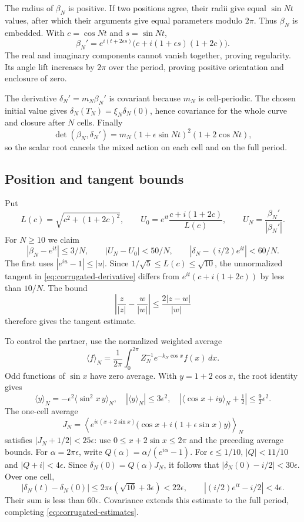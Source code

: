 \documentclass[11pt]{amsart}
\theoremstyle{definition}
\theoremstyle{remark}
\numberwithin{equation}{section}
\begin{document}
The radius of $\beta_N$ is positive. If two positions agree, their radii
give equal $\sin Nt$ values, after which their arguments give equal
parameters modulo $2\pi$. Thus $\beta_N$ is embedded. With
$c=\cos Nt$ and $s=\sin Nt$,
\begin{equation}\label{eq:corrugated-derivative}
 \beta_N'=e^{i(t+2\epsilon s)}
       \bigl(c+i(1+\epsilon s)(1+2c)\bigr).
\end{equation}
The real and imaginary components cannot vanish together, proving
regularity. Its angle lift increases by $2\pi$ over the period, proving
positive orientation and enclosure of zero.

The derivative $\delta_N'=m_N\beta_N'$ is covariant because $m_N$ is
cell-periodic. The chosen initial value gives
$\delta_N(T_N)=\xi_N\delta_N(0)$, hence covariance for the whole curve
and closure after $N$ cells. Finally
\[
 \det(\beta_N,\delta_N')
 =m_N(1+\epsilon\sin Nt)^2(1+2\cos Nt),
\]
so the scalar root cancels the mixed action on each cell and on the full
period.

\subsection{Position and tangent bounds}
Put
\[
 L(c)=\sqrt{c^2+(1+2c)^2},\qquad
 U_0=e^{it}\frac{c+i(1+2c)}{L(c)},\qquad
 U_N=\frac{\beta_N'}{|\beta_N'|}.
\]
For $N\ge10$ we claim
\begin{equation}\label{eq:corrugated-estimates}
 |\beta_N-e^{it}|\le3/N,\qquad
 |U_N-U_0|<50/N,\qquad
 |\delta_N-(i/2)e^{it}|<60/N.
\end{equation}
The first uses $|e^{iu}-1|\le|u|$. Since
$1/\sqrt5\le L(c)\le\sqrt{10}$, the unnormalized tangent in
\eqref{eq:corrugated-derivative} differs from
$e^{it}(c+i(1+2c))$ by less than $10/N$. The bound
\[
 \left|\frac z{|z|}-\frac w{|w|}\right|\le\frac{2|z-w|}{|w|}
\]
therefore gives the tangent estimate.

To control the partner, use the normalized weighted average
\[
 \langle f\rangle_N=\frac1{2\pi}\int_0^{2\pi}
                Z_N^{-1}e^{-k_N\cos x}f(x)\,dx.
\]
Odd functions of $\sin x$ have zero average. With $y=1+2\cos x$,
the root identity gives
\[
 \langle y\rangle_N=-\epsilon^2\langle\sin^2x\,y\rangle_N,
 \quad |\langle y\rangle_N|\le3\epsilon^2,
 \quad\left|\langle\cos x+iy\rangle_N+\tfrac12\right|
          \le\tfrac92\epsilon^2.
\]
The one-cell average
\[
 J_N=\left\langle e^{i\epsilon(x+2\sin x)}
       \bigl(\cos x+i(1+\epsilon\sin x)y\bigr)\right\rangle_N
\]
satisfies $|J_N+1/2|<25\epsilon$: use
$0\le x+2\sin x\le2\pi$ and the preceding average bounds.
For $\alpha=2\pi\epsilon$, write $Q(\alpha)=\alpha/(e^{i\alpha}-1)$.
For $\epsilon\le1/10$, $|Q|<11/10$ and $|Q+i|<4\epsilon$.
Since $\delta_N(0)=Q(\alpha)J_N$, it follows that
$|\delta_N(0)-i/2|<30\epsilon$.
Over one cell,
\[
 |\delta_N(t)-\delta_N(0)|
 \le2\pi\epsilon(\sqrt{10}+3\epsilon)<22\epsilon,
 \qquad |(i/2)e^{it}-i/2|<4\epsilon.
\]
Their sum is less than $60\epsilon$. Covariance extends this estimate
to the full period, completing \eqref{eq:corrugated-estimates}.
\end{document}
